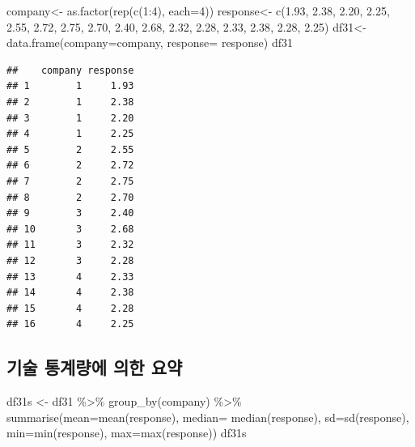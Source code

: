 \documentclass[
]{book}
\newenvironment{Shaded}{\begin{snugshade}}{\end{snugshade}}
\newcommand{\AttributeTok}[1]{\textcolor[rgb]{0.77,0.63,0.00}{#1}}
\newcommand{\DecValTok}[1]{\textcolor[rgb]{0.00,0.00,0.81}{#1}}
\newcommand{\FloatTok}[1]{\textcolor[rgb]{0.00,0.00,0.81}{#1}}
\newcommand{\FunctionTok}[1]{\textcolor[rgb]{0.00,0.00,0.00}{#1}}
\newcommand{\NormalTok}[1]{#1}
\newcommand{\OtherTok}[1]{\textcolor[rgb]{0.56,0.35,0.01}{#1}}
\newcommand{\SpecialCharTok}[1]{\textcolor[rgb]{0.00,0.00,0.00}{#1}}
\begin{document}
\begin{Shaded}
\begin{Highlighting}[]
\NormalTok{company}\OtherTok{\textless{}{-}} \FunctionTok{as.factor}\NormalTok{(}\FunctionTok{rep}\NormalTok{(}\FunctionTok{c}\NormalTok{(}\DecValTok{1}\SpecialCharTok{:}\DecValTok{4}\NormalTok{), }\AttributeTok{each=}\DecValTok{4}\NormalTok{))}
\NormalTok{response}\OtherTok{\textless{}{-}} \FunctionTok{c}\NormalTok{(}\FloatTok{1.93}\NormalTok{, }\FloatTok{2.38}\NormalTok{, }\FloatTok{2.20}\NormalTok{, }\FloatTok{2.25}\NormalTok{,}
             \FloatTok{2.55}\NormalTok{, }\FloatTok{2.72}\NormalTok{, }\FloatTok{2.75}\NormalTok{, }\FloatTok{2.70}\NormalTok{,}
             \FloatTok{2.40}\NormalTok{, }\FloatTok{2.68}\NormalTok{, }\FloatTok{2.32}\NormalTok{, }\FloatTok{2.28}\NormalTok{,}
             \FloatTok{2.33}\NormalTok{, }\FloatTok{2.38}\NormalTok{, }\FloatTok{2.28}\NormalTok{, }\FloatTok{2.25}\NormalTok{)}
\NormalTok{df31}\OtherTok{\textless{}{-}} \FunctionTok{data.frame}\NormalTok{(}\AttributeTok{company=}\NormalTok{company, }\AttributeTok{response=}\NormalTok{ response)}
\NormalTok{df31}
\end{Highlighting}
\end{Shaded}

\begin{verbatim}
##    company response
## 1        1     1.93
## 2        1     2.38
## 3        1     2.20
## 4        1     2.25
## 5        2     2.55
## 6        2     2.72
## 7        2     2.75
## 8        2     2.70
## 9        3     2.40
## 10       3     2.68
## 11       3     2.32
## 12       3     2.28
## 13       4     2.33
## 14       4     2.38
## 15       4     2.28
## 16       4     2.25
\end{verbatim}

\hypertarget{uxae30uxc220-uxd1b5uxacc4uxb7c9uxc5d0-uxc758uxd55c-uxc694uxc57d}{%
\subsection{기술 통계량에 의한 요약}\label{uxae30uxc220-uxd1b5uxacc4uxb7c9uxc5d0-uxc758uxd55c-uxc694uxc57d}}

\begin{Shaded}
\begin{Highlighting}[]
\NormalTok{df31s }\OtherTok{\textless{}{-}}\NormalTok{ df31 }\SpecialCharTok{\%\textgreater{}\%} \FunctionTok{group\_by}\NormalTok{(company)  }\SpecialCharTok{\%\textgreater{}\%}  \FunctionTok{summarise}\NormalTok{(}\AttributeTok{mean=}\FunctionTok{mean}\NormalTok{(response), }\AttributeTok{median=} \FunctionTok{median}\NormalTok{(response), }\AttributeTok{sd=}\FunctionTok{sd}\NormalTok{(response), }\AttributeTok{min=}\FunctionTok{min}\NormalTok{(response), }\AttributeTok{max=}\FunctionTok{max}\NormalTok{(response))}
\NormalTok{df31s}
\end{Highlighting}
\end{Shaded}
\end{document}
